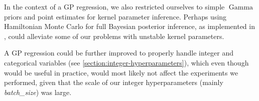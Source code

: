 In the context of a GP regression, we also restricted ourselves to simple $\operatorname{Gamma}$ priors and point estimates for kernel parameter inference. Perhaps using Hamiltonian Monte Carlo for full Bayesian posterior inference, as implemented in \cite{gpy2014}, could alleviate some of our problems with unstable kernel parameters.

A GP regression could be further improved to properly handle integer and categorical variables (see \autoref{section:integer-hyperparameters}), which even though would be useful in practice, would most likely not affect the experiments we performed, given that the scale of our integer hyperparameters (mainly \emph{batch\_size}) was large.

